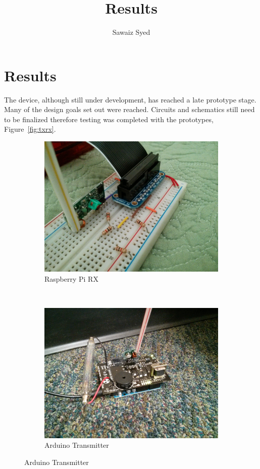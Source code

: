 \documentclass[10pt]{article}
\author{Sawaiz Syed}
\title{Results}
\begin{document}
\maketitle

\section{Results}
The device, although still under development, has reached a late prototype stage. Many of the design goals set out were reached. Circuits and schematics still need to be finalized therefore testing was completed with the prototypes, Figure~\ref{fig:txrx}. 

\begin{figure}
	\centering
	\begin{subfigure}[b]{0.3\textwidth}
		\includegraphics[width=\textwidth]{RaspberryPiRX.jpg}
		\caption{Raspberry Pi RX }
		\label{fig:pirx}
	\end{subfigure}%
	~ %
	\begin{subfigure}[b]{0.3\textwidth}
		\includegraphics[width=\textwidth]{TransmitterArduinoCarpet.jpg}
		\caption{Arduino Transmitter}
		\label{fig:arduinotx}
	\end{subfigure}


\end{figure}
\end{document}

